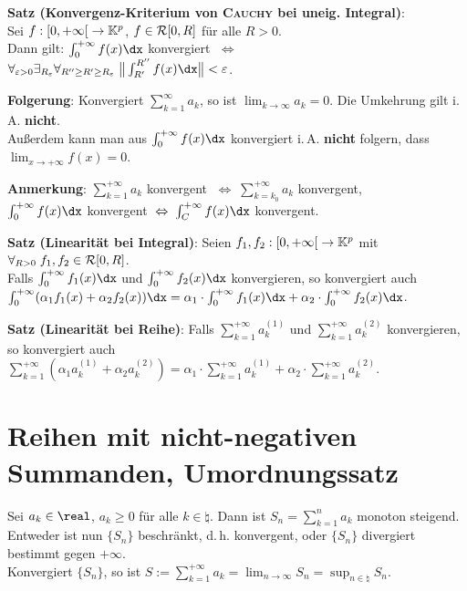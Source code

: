 \textbf{Satz (Konvergenz-Kriterium von \textsc{Cauchy} bei uneig. Integral)}:
\\
Sei $f: \left[0,+\infty\right[ \rightarrow \mathbb{K}^p$,
$f \in \mathcal{R}[0, R]$ für alle $R > 0$. \\
Dann gilt:
$\int_0^{+\infty} f(x)\dx$ konvergiert $\;\Leftrightarrow\;$
$\forall_{\varepsilon > 0} \exists_{R_\varepsilon}
\forall_{R'' \ge R' \ge R_\varepsilon}\;
\big\Vert \int_{R'}^{R''} f(x)\dx \big\Vert < \varepsilon$.

\linie

\textbf{Folgerung}:
Konvergiert $\sum_{k=1}^\infty a_k$, so ist $\lim_{k \to \infty} a_k = 0$.
\qquad
Die Umkehrung gilt i.\,A. \textbf{nicht}. \\
Außerdem kann man aus $\int_0^{+\infty} f(x)\dx$ konvergiert i.\,A.
\textbf{nicht} folgern, dass $\lim_{x \to +\infty} f(x) = 0$.

\textbf{Anmerkung}:
$\sum_{k=1}^{+\infty} a_k$ konvergent
$\;\Leftrightarrow\; \sum_{k=k_0}^{+\infty} a_k$ konvergent, \\
$\int_0^{+\infty} f(x)\dx$ konvergent
$\;\Leftrightarrow\; \int_C^{+\infty} f(x)\dx$ konvergent.

\linie

\textbf{Satz (Linearität bei Integral)}:
Seien $f_1, f_2: \left[0,+\infty\right[ \rightarrow \mathbb{K}^p$
mit $\forall_{R > 0}\; f_1, f_2 \in \mathcal{R}[0,R]$. \\
Falls $\int_0^{+\infty} f_1(x)\dx$ und $\int_0^{+\infty} f_2(x)\dx$ konvergieren,
so konvergiert auch \\
$\int_0^{+\infty} (\alpha_1 f_1(x) + \alpha_2 f_2(x))\dx
= \alpha_1 \cdot \int_0^{+\infty} f_1(x)\dx +
\alpha_2 \cdot \int_0^{+\infty} f_2(x)\dx$.

\textbf{Satz (Linearität bei Reihe)}:
Falls $\sum_{k=1}^{+\infty} a^{(1)}_k$ und $\sum_{k=1}^{+\infty} a^{(2)}_k$
konvergieren, so konvergiert auch
$\sum_{k=1}^{+\infty} (\alpha_1 a^{(1)}_k + \alpha_2 a^{(2)}_k)
= \alpha_1 \cdot \sum_{k=1}^{+\infty} a^{(1)}_k +
\alpha_2 \cdot \sum_{k=1}^{+\infty} a^{(2)}_k$.

\section{%
    Reihen mit nicht-negativen Summanden, Umordnungssatz%
}

Sei $a_k \in \real$, $a_k \ge 0$ für alle $k \in \natural$.
Dann ist $S_n = \sum_{k=1}^n a_k$ monoton steigend. \\
Entweder ist nun $\{S_n\}$ beschränkt, d.\,h. konvergent,
oder $\{S_n\}$ divergiert bestimmt gegen $+\infty$. \\
Konvergiert $\{S_n\}$, so ist $S := \sum_{k=1}^{+\infty} a_k
= \lim_{n \to \infty} S_n = \sup_{n \in \natural} S_n$.

